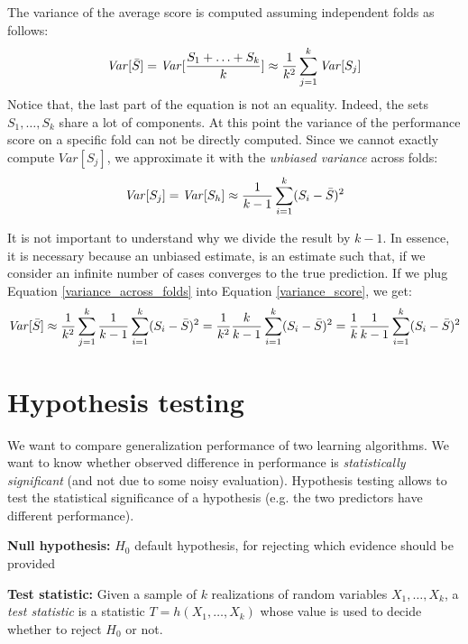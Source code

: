 The variance of the average score is computed assuming independent folds as follows:
\begin{equation}
    \label{variance_score}
    \mathit{Var}[\Bar{S}] = \mathit{Var}[\frac{S_1+\hdots+S_k}{k}] \approx \frac{1}{k^2} \sum_{j=1}^k \mathit{Var}[S_j]
\end{equation}
Notice that, the last part of the equation is not an equality. Indeed, the sets $S_1, \hdots, S_k$ share a lot of components. At this point the variance of the performance score on a specific fold can not be directly computed. Since we cannot exactly compute $\mathit{Var}[S_j]$, we approximate it with the \textit{unbiased variance} across folds:
\begin{equation}
    \label{variance_across_folds}
    \mathit{Var}[S_j] = \mathit{Var}[S_h] \approx \frac{1}{k-1} \sum_{i=1}^k(S_i - \Bar{S})^2
\end{equation}

It is not important to understand why we divide the result by $k-1$. In essence, it is necessary because an unbiased estimate, is an estimate such that, if we consider an infinite number of cases converges to the true prediction. If we plug Equation \ref{variance_across_folds} into Equation \ref{variance_score}, we get:
\begin{equation}
    \mathit{Var}[\Bar{S}] \approx \frac{1}{k^2} \sum_{j=1}^k \frac{1}{k-1} \sum_{i=1}^k(S_i - \Bar{S})^2 = \frac{1}{k^2} \frac{k}{k-1} \sum_{i=1}^k(S_i - \Bar{S})^2 = \frac{1}{k} \frac{1}{k-1} \sum_{i=1}^k(S_i - \Bar{S})^2
\end{equation}

\section{Hypothesis testing}
We want to compare generalization performance of two learning algorithms. We want to know whether observed difference in performance is \textit{statistically significant} (and not due to some noisy evaluation). Hypothesis testing allows to test the statistical significance of a hypothesis (e.g. the two predictors have different performance). \newline

\textbf{Null hypothesis:} $H_0$ default hypothesis, for rejecting which evidence should be provided \newline

\textbf{Test statistic:} Given a sample of $k$ realizations of random variables $X_1, \hdots, X_k$, a \textit{test statistic} is a statistic $T=h(X_1, \hdots ,X_k)$ whose value is used to decide whether to reject $H_0$ or not. \newline

